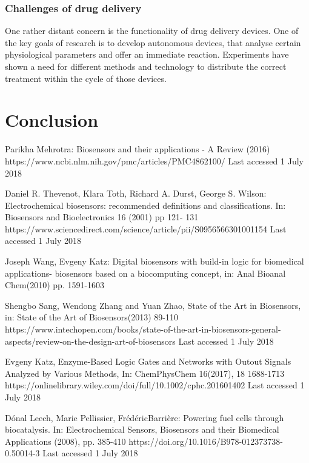 \documentclass[runningheads]{llncs}
\begin{document}
\subsubsection{Challenges of drug delivery}	One rather distant concern is the functionality of drug delivery devices. One of the key goals of research is to develop autonomous devices, that analyse certain physiological parameters and offer an immediate reaction. Experiments have shown a need for different methods and technology to distribute the correct treatment within the cycle of those devices. \cite{original}


\section{Conclusion}


\begin{thebibliography}{8}
	Parikha Mehrotra: Biosensors and their applications - A Review (2016) https://www.ncbi.nlm.nih.gov/pmc/articles/PMC4862100/ Last accessed 1 July 2018
	
	Daniel R. Thevenot, Klara Toth, Richard A. Durst, George S. Wilson: Electrochemical biosensors: recommended definitions and classifications. In: Biosensors and Bioelectronics 16 (2001) pp 121- 131 https://www.sciencedirect.com/science/article/pii/S0956566301001154 Last accessed 1 July 2018
	
	Joseph Wang, Evgeny Katz: Digital biosensors with build-in logic for biomedical applications- biosensors based on a biocomputing concept, in: Anal Bioanal Chem(2010) pp. 1591-1603 
	
	Shengbo Sang, Wendong Zhang and Yuan Zhao, State of the Art in Biosensors, in: State of the Art of Biosensors(2013) 89-110 https://www.intechopen.com/books/state-of-the-art-in-biosensors-general-aspects/review-on-the-design-art-of-biosensors Last accessed 1 July 2018
	
	Evgeny Katz, Enzyme-Based Logic Gates and Networks with Outout Signals Analyzed by Various Methods, In: ChemPhysChem 16(2017), 18 1688-1713 https://onlinelibrary.wiley.com/doi/full/10.1002/cphc.201601402 Last accessed 1 July 2018
	
	Dónal Leech, Marie Pellissier, FrédéricBarrière: Powering fuel cells through biocatalysis. In: Electrochemical Sensors, Biosensors and their Biomedical Applications (2008), pp. 385-410 https://doi.org/10.1016/B978-012373738-0.50014-3 Last accessed 1 July 2018
	

\end{thebibliography}
\end{document}
